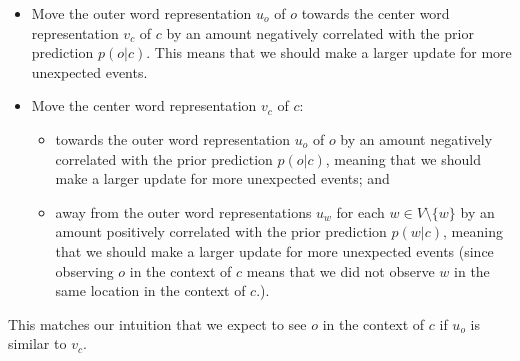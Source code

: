 \begin{itemize}
\item Move the outer word representation $u_o$ of $o$ towards the center word representation $v_c$ of $c$ by an amount negatively correlated with the prior prediction $p(o | c)$. This means that we should make a larger update for more unexpected events.
\item Move the center word representation $v_c$ of $c$:
\begin{itemize}
\item towards the outer word representation $u_o$ of $o$ by an amount negatively correlated with the prior prediction $p(o | c)$, meaning that we should make a larger update for more unexpected events; and
\item away from the outer word representations $u_w$ for each $w \in V \setminus \{w\}$ by an amount positively correlated with the prior prediction $p(w | c)$, meaning that we should make a larger update for more unexpected events (since observing $o$ in the context of $c$ means that we did not observe $w$ in the same location in the context of $c$.).
\end{itemize}
\end{itemize}
This matches our intuition that we expect to see $o$ in the context of $c$ if $u_o$ is similar to $v_c$.
